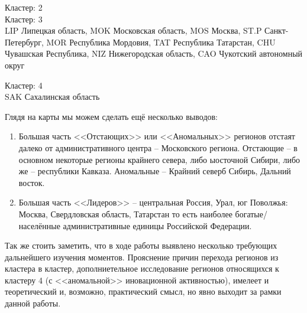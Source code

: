 \documentclass[11pt]{article}
\begin{document}
Кластер:  2 \\


Кластер:  3 \\
LIP Липецкая область, MOK Московская область, MOS Москва, ST.P Санкт-Петербург, MOR Республика Мордовия, TAT Республика Татарстан, CHU Чувашская Республика, NIZ Нижегородская область, CAO Чукотский автономный округ

Кластер:  4 \\
SAK Сахалинская область


\par\bigskip

    Глядя на карты мы можем сделать ещё несколько выводов:

\begin{enumerate}
\item Большая часть <<Отстающих>> или <<Аномальных>> регионов отстаят далеко от административного центра -- Московского региона. Отстающие -- в основном некоторые регионы крайнего севера, либо ыосточной Сибири, либо же -- республики Кавказа. Аномальные -- Крайний северб Сибирь, Дальний восток.
\item Большая часть <<Лидеров>> -- центральная Россия, Урал, юг Поволжья: Москва, Свердловская область, Татарстан то есть наиболее богатые/населённые  административные единицы Российской Федерации.
\end{enumerate}

Так же стоить заметить, что в ходе работы выявлено несколько требующих
дальнейшего изучения моментов. Прояснение причин перехода регионов из
кластера в кластер, дополниетельное исследование регионов относящихся к
кластеру 4 (с <<аномальной>> иновационной активностью), имелеет и
теоретический и, возможно, практический смысл, но явно выходит за рамки
данной работы.

\newpage

\end{document}
